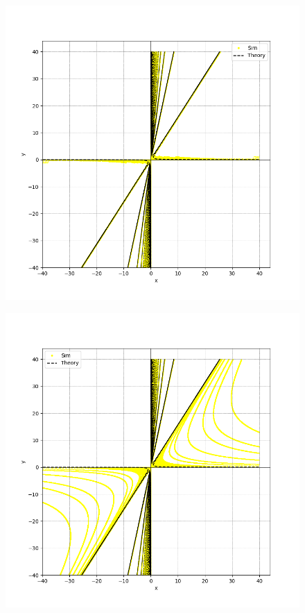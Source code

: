 \documentclass{beamer}
\theoremstyle{remark}
\numberwithin{equation}{section}
\begin{document}
\begin{frame}
	\begin{figure}[h]
		\centering
		\includegraphics[width=0.8\linewidth]{figs/fig.png}
		\caption{}
		\label{graph3}
	\end{figure}
\end{frame}
\begin{frame}
	\begin{figure}[h]
		\centering
		\includegraphics[width=0.8\linewidth]{figs/figf.png}
		\caption{}
		\label{graph3}
	\end{figure}
\end{frame}
\end{document}
